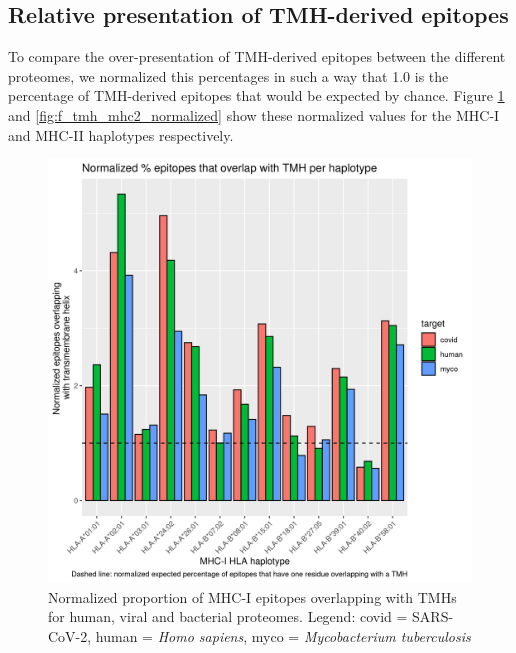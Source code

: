 \subsection{Relative presentation of TMH-derived epitopes}

To compare the over-presentation of TMH-derived epitopes between the
different proteomes, we normalized this percentages in such a
way that 1.0 is the percentage of TMH-derived epitopes that would 
be expected by chance. 
Figure \ref{fig:f_tmh_mhc1_normalized} and \ref{fig:f_tmh_mhc2_normalized}
show these normalized values for the MHC-I and MHC-II haplotypes respectively.

\begin{figure}[!htbp]
  \includegraphics[width=\textwidth]{bbbq_1_smart_results/fig_f_tmh_mhc1_2_normalized.png}
  \caption{
    Normalized proportion of MHC-I epitopes overlapping with TMHs
    for human, viral and bacterial proteomes.
    Legend: covid = SARS-CoV-2,
    human = \emph{Homo sapiens}, 
    myco = \emph{Mycobacterium tuberculosis}
  }
  \label{fig:f_tmh_mhc1_normalized}
\end{figure}


